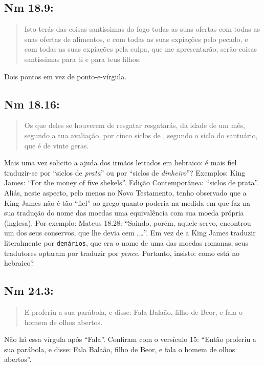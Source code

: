 \subsection{Nm 18.9:}
\begin{quote}
    \small
Isto terás das coisas santíssimas do fogo\uwave{;} todas as suas ofertas com todas as suas ofertas de alimentos, e com todas as suas expiações pelo pecado, e com todas as suas expiações pela culpa, que me apresentarão; serão coisas santíssimas para ti e para teus filhos.
\end{quote}

Dois pontos em vez de ponto-e-vírgula.

\subsection{Nm 18.16:}
\begin{quote}
    \small
Os que deles se houverem de resgatar resgatarás, da idade de um mês, segundo a tua avaliação, por cinco siclos de , segundo o siclo do santuário, que é de vinte geras.
\end{quote}

Mais uma vez solicito a ajuda dos irmãos letrados em hebraico: é mais fiel traduzir-se por ``siclos de \emph{prata}'' ou por ``siclos de \emph{dinheiro}''? Exemplos: King James: ``For the money of five shekels''. Edição Contemporânea: ``siclos de prata''. Aliás, neste aspecto, pelo menos no Novo Testamento, tenho observado que a King James não é tão ``fiel'' ao grego quanto poderia na medida em que faz na
sua tradução do nome das moedas uma equivalência com sua moeda própria (inglesa). Por exemplo: Mateus 18.28: ``Saindo, porém, aquele servo, encontrou um dos seus conservos, que lhe devia cem ,\ldots''. Em vez de a King James traduzir literalmente por \texttt{denários}, que era o nome de uma das moedas
romanas, seus tradutores optaram por traduzir por \emph{pence}. Portanto, insisto: como está no hebraico?

\subsection{Nm 24.3:}
\begin{quote}
    \small
E proferiu a sua parábola, e disse: Fala\uwave{,} Balaão, filho de Beor, e fala o homem de olhos abertos.
\end{quote}

Não há essa vírgula após ``Fala''. Confiram com o versículo 15: ``Então
proferiu a sua parábola, e disse: Fala Balaão, filho de Beor, e fala o
homem de olhos abertos''.

